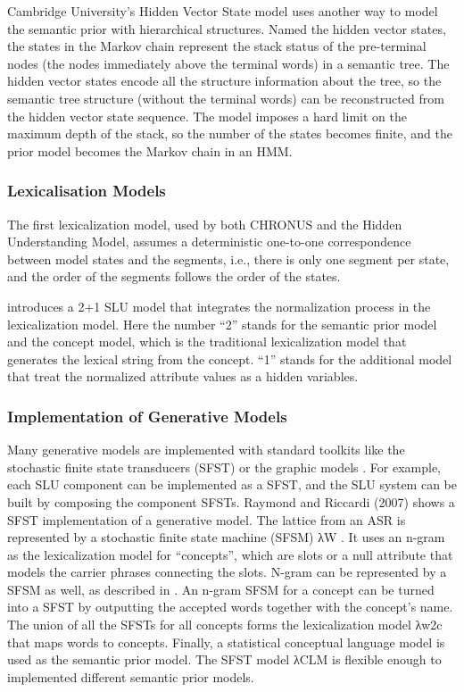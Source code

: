 Cambridge University’s Hidden Vector State model \cite{dataset-flickr30k} uses another way
to model the semantic prior with hierarchical structures. Named the hidden vector states, the
states in the Markov chain represent the stack status of the pre-terminal nodes (the nodes
immediately above the terminal words) in a semantic tree. The hidden vector states encode all the structure information about the tree, so the semantic tree structure (without the terminal words) can be reconstructed from the hidden vector state sequence. The model imposes a hard limit on the maximum depth of the stack, so the number of the states becomes finite, and the prior model becomes the Markov chain in an HMM.

\subsubsection{Lexicalisation Models}
The first lexicalization model, used by both CHRONUS and
the Hidden Understanding Model, assumes a deterministic one-to-one
correspondence between model states and the segments, i.e., there is only one segment per
state, and the order of the segments follows the order of the states.

\cite{d1e193} introduces a 2+1 SLU model that integrates the normalization process in
the lexicalization model. Here the number “2” stands for the semantic prior model and the
concept model, which is the traditional lexicalization model that generates the lexical string
from the concept. “1” stands for the additional model that treat the normalized attribute
values as a hidden variables.

\subsubsection{Implementation of Generative Models}
Many generative models are implemented with standard toolkits like the stochastic finite
state transducers (SFST) \cite{raymond} or the graphic models \cite{d1e56}. For example, each SLU component can be implemented as a SFST, and the
SLU system can be built by composing the component SFSTs. Raymond and Riccardi
(2007) shows a SFST implementation of a generative model. The lattice from an ASR
is represented by a stochastic finite state machine (SFSM) λW . It uses an n-gram as the
lexicalization model for “concepts”, which are slots or a null attribute that models the carrier
phrases connecting the slots. N-gram can be represented by a SFSM as well, as described
in \cite{d1e301}. An n-gram SFSM for a concept can be turned into a SFST by
outputting the accepted words together with the concept’s name. The union of all the SFSTs
for all concepts forms the lexicalization model λw2c that maps words to concepts. Finally, a
statistical conceptual language model is used as the semantic prior model. The SFST model
λCLM is flexible enough to implemented different semantic prior models.


